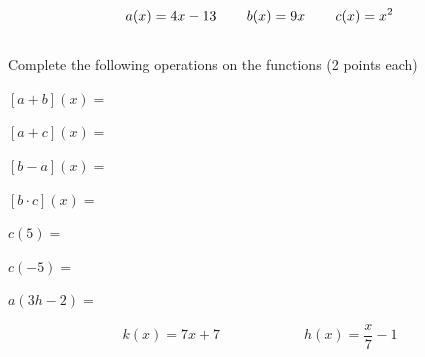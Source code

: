 \documentclass[12pt]{article}
\begin{document}
$$a(x)=4x-13 \hspace{.3in} b(x)=9x \hspace{.3in} c(x)=x^2$$\\

Complete the following operations on the functions (2 points each)\\

\begin{enumerate}
\begin{multicols}{2}
	\setlength\itemsep{1cm}

	\item $[a+b](x)=$\\
	
	\item $[a+c](x)=$\\
	
	\item $[b-a](x)=$\\
	
	\item $[b \cdot c](x)=$\\
	
	\item $c(5)=$\\
	
	\item $c(-5)=$\\
	
	\item $a(3h-2)=$\\

\end{multicols}
\end{enumerate}

\hrulefill

$$k(x)=7x+7 \hspace{1in} h(x)=\frac{x}{7}-1$$
\end{document}
